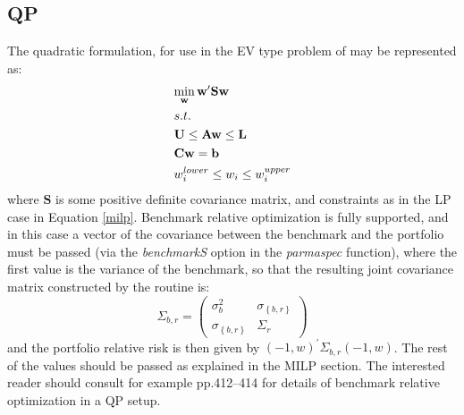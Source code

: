 \subsection{QP}
The quadratic formulation, for use in the EV type problem of
\citet{Markowitz1952} may be represented as:
\begin{equation}\label{qp}
\begin{gathered}
  \mathop {\min }\limits_{\mathbf{w}} {\mathbf{w'Sw}} \hfill \\
  s.t. \hfill \\
  {\mathbf{U}} \leq {\mathbf{Aw}} \leq {\mathbf{L}} \hfill \\
  {\mathbf{Cw}}={\mathbf{b}} \hfill \\
  w_i^{lower} \leq {w_i} \leq w_i^{upper} \hfill \\
\end{gathered}
\end{equation}
where $\mathbf{S}$ is some positive definite covariance matrix, and
constraints as in the LP case in Equation \eqref{milp}. Benchmark relative
optimization is fully supported, and in this case a vector of the covariance
between the benchmark and the portfolio must be passed (via the \emph{benchmarkS}
option in the \emph{parmaspec} function), where the first value is the variance of
the benchmark, so that the resulting joint covariance matrix constructed by the
routine is:
\begin{equation}
{\Sigma _{b,r}} = \left( {\begin{array}{*{20}{c}}
  {\sigma _b^2}&{{\sigma _{\left\{ {b,r} \right\}}}} \\ 
  {{\sigma _{\left\{ {b,r} \right\}}}}&{{\Sigma _r}} 
\end{array}} \right)
\end{equation}
and the portfolio relative risk is then given by ${\left( { - 1,w} \right)^\prime }{\Sigma _{b,r}}\left( { - 1,w} \right)$.
The rest of the values should be passed as explained in the MILP section. The interested reader should 
consult for example \citet{Stoyanov2007} pp.412--414 for details of benchmark relative optimization in a QP setup.
